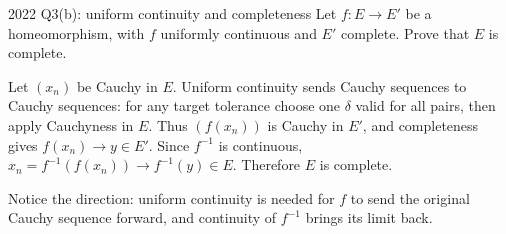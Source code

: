 \begin{exam}{2022 Q3(b): uniform continuity and completeness}
Let $f:E\to E'$ be a homeomorphism, with $f$ uniformly continuous and $E'$ complete. Prove that $E$ is complete.
\end{exam}
\begin{answer}
Let $(x_n)$ be Cauchy in $E$. Uniform continuity sends Cauchy sequences to Cauchy sequences: for any target tolerance choose one $\delta$ valid for all pairs, then apply Cauchyness in $E$. Thus $(f(x_n))$ is Cauchy in $E'$, and completeness gives $f(x_n)\to y\in E'$. Since $f^{-1}$ is continuous, $x_n=f^{-1}(f(x_n))\to f^{-1}(y)\in E$. Therefore $E$ is complete.

Notice the direction: uniform continuity is needed for $f$ to send the original Cauchy sequence forward, and continuity of $f^{-1}$ brings its limit back.
\end{answer}


